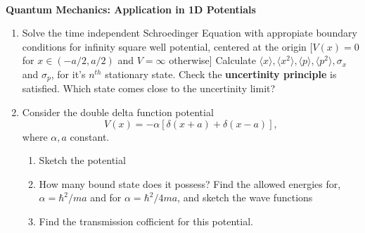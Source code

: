 \documentclass{article}[12pt, a4paper]
\begin{document}
\hline \\
\begin{center}
	\textbf{Quantum Mechanics: Application in 1D Potentials}
\end{center}

\begin{enumerate}

\item Solve the time independent Schroedinger Equation with appropiate boundary conditions
for infinity square well potential, centered at the origin [$V(x) = 0$ for $x \in (-a/2, a/2)$ and $V = \infty$ otherwise]
Calculate $\langle x \rangle, \langle x^2 \rangle, \langle p \rangle, \langle p^2 \rangle, \sigma_x$ and $\sigma_p$,
for it's $n^{th}$ stationary state. Check the \textbf{uncertinity principle} is satisfied. Which state
comes close to the uncertinity limit?

\item Consider the double delta function potential $$V(x) = -\alpha[\delta(x + a) + \delta(x - a)],$$
where $\alpha, a$ constant.
\begin{enumerate}
	\item Sketch the potential
	\item How many bound state does it possess? Find the allowed energies for, $\alpha = \hbar^2/ma$ and for
	$\alpha = \hbar^2/4ma$, and sketch the wave functions
	\item Find the transmission cofficient for this potential.
 \end{enumerate}

\end{enumerate}
\end{document}
